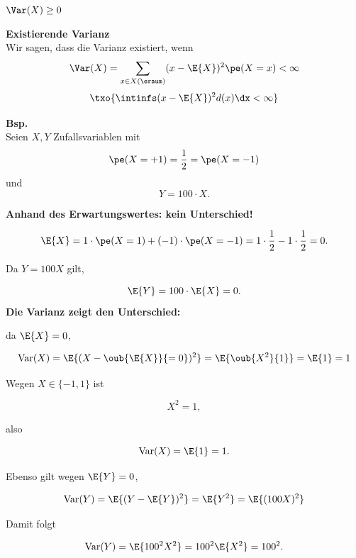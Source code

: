 \begin{bem} 
$\Var(X) \geq 0$
\end{bem}

\begin{defi}
    \textbf{Existierende Varianz}   \\
    Wir sagen, dass die Varianz existiert, wenn
    \[
        \Var(X) = \sum_{x\in X(\eraum)} (x - \E{X})^2 \pe(X=x) < \infty
    \]
    \[
        \txo{ \intinfs (x - \E{X})^2 d(x) \dx < \infty }
    \]
\end{defi}

\begin{bsp}
    \textbf{Bsp.}  \\

    Seien \(X, Y\) Zufallsvariablen mit
    \[
        \pe(X=+1)=\frac{1}{2}=\pe(X=-1)
    \]
    und
    \[
        Y=100\cdot X.
    \]

    \textbf{Anhand des Erwartungswertes: kein Unterschied!}

    \[
        \E{X}
        =1\cdot \pe(X=1)+(-1)\cdot \pe(X=-1)
        =1\cdot\frac{1}{2}-1\cdot\frac{1}{2}
        =0.
    \]

    Da \(Y=100X\) gilt,

    \[
        \E{Y}=100\cdot \E{X}=0.
    \]
    \textbf{Die Varianz zeigt den Unterschied:}

    da \(\E{X}=0\),

    \[
        \operatorname{Var}(X)
        =\E{(X- \oub{\E{X}}{=0} )^{2}}
        =\E{ \oub{X^{2}}{1} }
        = \E{1}
        = 1
    \]

    Wegen \(X\in\{-1,1\}\) ist

    \[
        X^{2}=1,
    \]

    also

    \[
        \operatorname{Var}(X)
        =\E{1}
        =1.
    \]

    Ebenso gilt wegen \(\E{Y}=0\),

    \[
        \operatorname{Var}(Y)
        =\E{(Y-\E{Y})^{2}}
        =\E{Y^2}
        =\E{(100X)^{2}}
    \]

    Damit folgt

    \[
        \operatorname{Var}(Y)
        =\E{100^{2}X^{2}}
        =100^{2}\E{X^{2}}
        =100^{2}.
    \]
\end{bsp}

